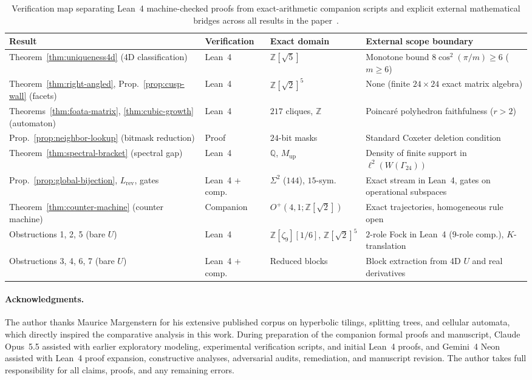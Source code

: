 \begin{table}[tb]
\centering
\caption{Verification map separating Lean~4 machine-checked proofs from exact-arithmetic companion scripts and explicit external mathematical bridges across all results in the paper~\cite{pollard2026repo}.}
\label{tab:verification-map}
\footnotesize
\setlength{\tabcolsep}{4.5pt}
\begin{tabularx}{\textwidth}{@{}lllX@{}}
\toprule
Result & Verification & Exact domain & External scope boundary \\
\midrule
Theorem~\ref{thm:uniqueness4d} (4D classification) & Lean~4 & $\mathbb{Z}[\sqrt{5}]$ & Monotone bound $8\cos^2(\pi/m) \ge 6$ ($m \ge 6$) \\
Theorem~\ref{thm:right-angled}, Prop.~\ref{prop:cusp-wall} (facets) & Lean~4 & $\mathbb{Z}[\sqrt{2}]^5$ & None (finite $24 \times 24$ exact matrix algebra) \\
Theorems~\ref{thm:foata-matrix}, \ref{thm:cubic-growth} (automaton) & Lean~4 & $217$ cliques, $\mathbb{Z}$ & Poincar\'e polyhedron faithfulness ($r > 2$) \\
Prop.~\ref{prop:neighbor-lookup} (bitmask reduction) & Proof & $24$-bit masks & Standard Coxeter deletion condition \\
Theorem~\ref{thm:spectral-bracket} (spectral gap) & Lean~4 & $\mathbb{Q}$, $M_{\mathrm{up}}$ & Density of finite support in $\ell^2(W(\Gamma_{24}))$ \\
Prop.~\ref{prop:global-bijection}, $L_{\mathrm{rev}}$, gates & Lean~4 + comp. & $\Sigma^2$ ($144$), $15$-sym. & Exact stream in Lean~4, gates on operational subspaces \\
Theorem~\ref{thm:counter-machine} (counter machine) & Companion & $O^+(4,1;\mathbb{Z}[\sqrt{2}])$ & Exact trajectories, homogeneous rule open \\
Obstructions 1, 2, 5 (bare $U$) & Lean~4 & $\mathbb{Z}[\zeta_9][1/6],\,\mathbb{Z}[\sqrt{2}]^5$ & $2$-role Fock in Lean~4 ($9$-role comp.), $K$-translation \\
Obstructions 3, 4, 6, 7 (bare $U$) & Lean~4 + comp. & Reduced blocks & Block extraction from 4D $U$ and real derivatives \\
\bottomrule
\end{tabularx}
\end{table}

\paragraph{Acknowledgments.}
The author thanks Maurice Margenstern for his extensive published corpus on hyperbolic tilings, splitting trees, and cellular automata, which directly inspired the comparative analysis in this work. During preparation of the companion formal proofs and manuscript, Claude Opus~5.5 assisted with earlier exploratory modeling, experimental verification scripts, and initial Lean~4 proofs, and Gemini~4 Neon assisted with Lean~4 proof expansion, constructive analyses, adversarial audits, remediation, and manuscript revision. The author takes full responsibility for all claims, proofs, and any remaining errors.

